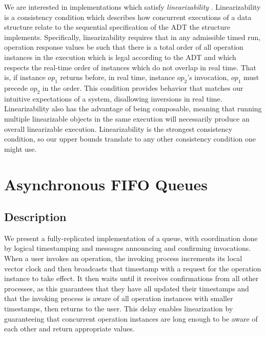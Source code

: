 \documentclass[a4paper,anonymous,USenglish]{lipics-v2021}
\theoremstyle{definition}
\begin{document}
We are interested in implementations which satisfy \emph{linearizability} \cite{HerlihyWing90}.  Linearizability is a consistency condition which describes how concurrent executions of a data structure relate to the sequential specification of the ADT the structure implements.  Specifically, linearizability requires that in any admissible timed run, operation response values be such that there is a total order of all operation instances in the execution which is legal according to the ADT and which respects the real-time order of instances which do not overlap in real time.  That is, if instance $op_1$ returns before, in real time, instance $op_2$'s invocation, $op_1$ must precede $op_2$ in the order.  This condition provides behavior that matches our intuitive expectations of a system, disallowing inversions in real time.  Linearizability also has the advantage of being composable, meaning that running multiple linearizable objects in the same execution will necessarily produce an overall linearizable execution.  Linearizability is the strongest consistency condition, so our upper bounds translate to any other consistency condition one might use.


\section{Asynchronous FIFO Queues}

\subsection{Description}

We present a fully-replicated implementation of a queue, with coordination done by logical timestamping and messages announcing and confirming invocations.  When a user invokes an operation, the invoking process increments its local vector clock and then broadcasts that timestamp with a request for the operation instance to take effect.  It then waits until it receives confirmations from all other processes, as this guarantees that they have all updated their timestamps and that the invoking process is aware of all operation instances with smaller timestamps, then returns to the user.  This delay enables linearization by guaranteeing that concurrent operation instances are long enough to be aware of each other and return appropriate values.
\end{document}
